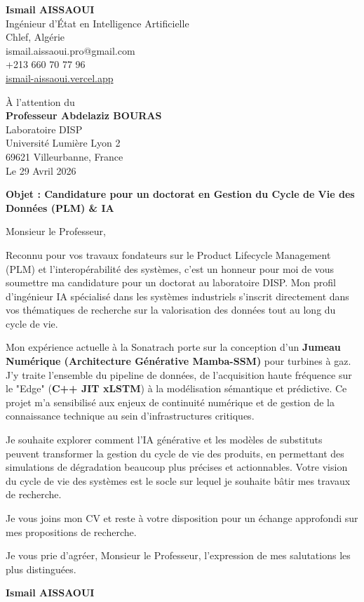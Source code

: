 \documentclass[a4paper,12pt]{article}
\begin{document}
\begin{flushleft}
    \textbf{Ismail AISSAOUI} \\
    Ingénieur d'État en Intelligence Artificielle \\
    Chlef, Algérie \\
    ismail.aissaoui.pro@gmail.com \\
    +213 660 70 77 96 \\
    \href{https://ismail-aissaoui.vercel.app}{ismail-aissaoui.vercel.app}
\end{flushleft}

\begin{flushright}
    À l'attention du \\
    \textbf{Professeur Abdelaziz BOURAS} \\
    Laboratoire DISP \\
    Université Lumière Lyon 2 \\
    69621 Villeurbanne, France \\
    \medskip
    Le 29 Avril 2026
\end{flushright}

\bigskip

\noindent \textbf{Objet : Candidature pour un doctorat en Gestion du Cycle de Vie des Données (PLM) \& IA}

\bigskip

Monsieur le Professeur,

Reconnu pour vos travaux fondateurs sur le Product Lifecycle Management (PLM) et l'interopérabilité des systèmes, c'est un honneur pour moi de vous soumettre ma candidature pour un doctorat au laboratoire DISP. Mon profil d'ingénieur IA spécialisé dans les systèmes industriels s'inscrit directement dans vos thématiques de recherche sur la valorisation des données tout au long du cycle de vie.

Mon expérience actuelle à la Sonatrach porte sur la conception d'un \textbf{Jumeau Numérique (Architecture Générative Mamba-SSM)} pour turbines à gaz. J'y traite l'ensemble du pipeline de données, de l'acquisition haute fréquence sur le "Edge" (\textbf{C++ JIT xLSTM}) à la modélisation sémantique et prédictive. Ce projet m'a sensibilisé aux enjeux de continuité numérique et de gestion de la connaissance technique au sein d'infrastructures critiques.

Je souhaite explorer comment l'IA générative et les modèles de substituts peuvent transformer la gestion du cycle de vie des produits, en permettant des simulations de dégradation beaucoup plus précises et actionnables. Votre vision du cycle de vie des systèmes est le socle sur lequel je souhaite bâtir mes travaux de recherche.

Je vous joins mon CV et reste à votre disposition pour un échange approfondi sur mes propositions de recherche.

Je vous prie d'agréer, Monsieur le Professeur, l'expression de mes salutations les plus distinguées.

\bigskip

\begin{flushright}
    \textbf{Ismail AISSAOUI}
\end{flushright}
\end{document}
